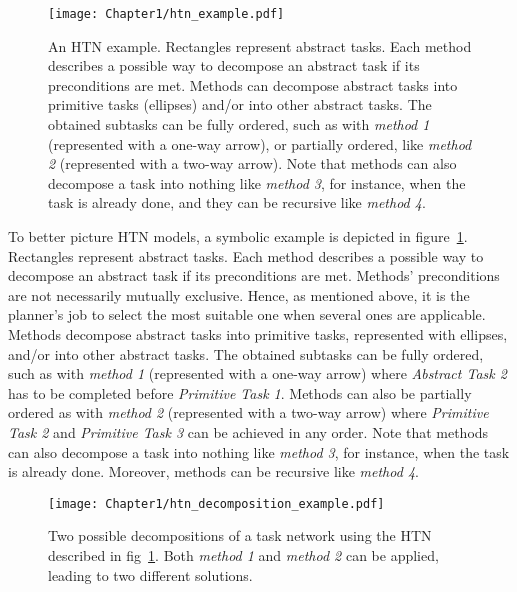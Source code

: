 \begin{figure}
    \center
    \texttt{[image: Chapter1/htn\_example.pdf]}
    \caption{An HTN example. Rectangles represent abstract tasks. Each method describes a possible way to decompose an abstract task if its preconditions are met. Methods can decompose abstract tasks into primitive tasks (ellipses) and/or into other abstract tasks. The obtained subtasks can be fully ordered, such as with \emph{method 1} (represented with a one-way arrow), or partially ordered, like \emph{method 2} (represented with a two-way arrow). Note that methods can also decompose a task into nothing like \emph{method 3}, for instance, when the task is already done, and they can be recursive like \emph{method 4}.
    }
    \label{fig:htn_example}
\end{figure}

To better picture HTN models, a symbolic example is depicted in figure~\ref{fig:htn_example}.
Rectangles represent abstract tasks. Each method describes a possible way to decompose an abstract task if its preconditions are met. Methods' preconditions are not necessarily mutually exclusive. Hence, as mentioned above, it is the planner's job to select the most suitable one when several ones are applicable.
Methods decompose abstract tasks into primitive tasks, represented with ellipses, and/or into other abstract tasks. The obtained subtasks can be fully ordered, such as with \emph{method 1} (represented with a one-way arrow) where \emph{Abstract Task 2} has to be completed before \emph{Primitive Task 1}. Methods can also be partially ordered as with \emph{method 2} (represented with a two-way arrow) where \emph{Primitive Task 2} and \emph{Primitive Task 3} can be achieved in any order. Note that methods can also decompose a task into nothing like \emph{method 3}, for instance, when the task is already done. Moreover, methods can be recursive like \emph{method 4}.

\begin{figure}
    \center
    \texttt{[image: Chapter1/htn\_decomposition\_example.pdf]}
    \caption{Two possible decompositions of a task network using the HTN described in fig~\ref{fig:htn_example}. Both \emph{method 1} and \emph{method 2} can be applied, leading to two different solutions.
    }
    \label{fig:htn_decomposition_example}
\end{figure}


